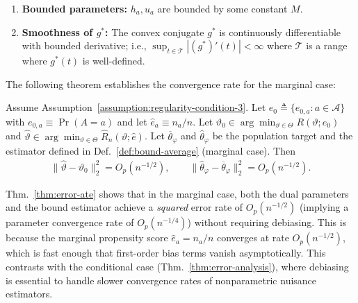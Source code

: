 \begin{assumption}
\begin{enumerate}[leftmargin=*]
\begin{align}
            \sup_{\vartheta} \big| \widehat R(\vartheta; \widehat e) - R(\vartheta; \widehat e) \big| = O_p(n^{-1/2}).
        \end{align}
        \item \textbf{Bounded parameters:} $h_a, u_a$ are bounded by some constant $M$. 
        \item \textbf{Smoothness of $g^{\ast}$:} The convex conjugate $g^{\ast}$ is continuously differentiable with bounded derivative; i.e., $\sup_{t \in \mathcal{T}}| (g^{\ast})'(t)| < \infty$ where $\mathcal{T}$ is a range where $g^{\ast}(t)$ is well-defined. 
    \end{enumerate}
\end{assumption}

The following theorem establishes the convergence rate for the marginal case:
\begin{theorem}\label{thm:error-ate}
\normalfont
Assume Assumption~\ref{assumption:regularity-condition-3}. Let $e_0\triangleq\{e_{0,a}:a\in\mathcal A\}$
with $e_{0,a}\equiv\Pr(A=a)$ and let $\widehat e_a\equiv n_a/n$. Let
$\vartheta_0\in\arg\min_{\vartheta\in\Theta} R(\vartheta;e_0)$ and
$\widehat\vartheta\in\arg\min_{\vartheta\in\Theta}\widehat R_n(\vartheta;\widehat e)$.
Let $\overline\theta_\varphi$ and $\widehat\theta_\varphi$ be the population target and the estimator
defined in Def.~\ref{def:bound-average} (marginal case).
Then
\begin{align}
\|\widehat\vartheta-\vartheta_0\|_2^2 = O_p(n^{-1/2}),
\qquad
\|\widehat\theta_\varphi-\overline\theta_\varphi\|_2^2 = O_p(n^{-1/2}).
\end{align}
\end{theorem}

Thm.~\ref{thm:error-ate} shows that in the marginal case, both the dual parameters and the bound estimator achieve a \emph{squared} error rate of $O_p(n^{-1/2})$ (implying a parameter convergence rate of $O_p(n^{-1/4})$) without requiring debiasing. This is because the marginal propensity score $\widehat{e}_a = n_a/n$ converges at rate $O_p(n^{-1/2})$, which is fast enough that first-order bias terms vanish asymptotically. This contrasts with the conditional case (Thm.~\ref{thm:error-analysis}), where debiasing is essential to handle slower convergence rates of nonparametric nuisance estimators.